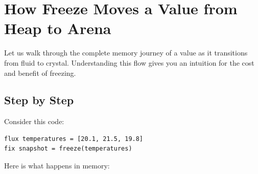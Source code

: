 
\section{How Freeze Moves a Value from Heap to Arena}\label{sec:freeze-mechanics}


Let us walk through the complete memory journey of a value as it transitions from fluid to crystal.
Understanding this flow gives you an intuition for the cost and benefit of freezing.

\subsection{Step by Step}

Consider this code:

\begin{lstlisting}[language=Lattice, caption={A freeze in slow motion}]
flux temperatures = [20.1, 21.5, 19.8]
fix snapshot = freeze(temperatures)
\end{lstlisting}

Here is what happens in memory:


